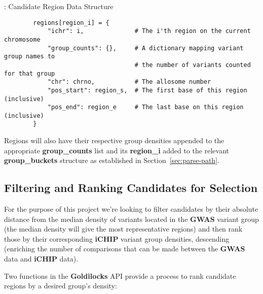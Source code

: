\begin{listing}[H]
    \caption[candidate-dict]{: Candidate Region Data Structure}
    \label{list:candidate-dict}
    \begin{verbatim}
        regions[region_i] = {
            "ichr": i,              # The i'th region on the current chromosome
            "group_counts": {},     # A dictionary mapping variant group names to
                                    # the number of variants counted for that group
            "chr": chrno,           # The allosome number
            "pos_start": region_s,  # The first base of this region (inclusive)
            "pos_end": region_e     # The last base on this region (inclusive)
        }
    \end{verbatim}
\end{listing}

Regions will also have their respective group densities appended to the
appropriate \textbf{group\_counts} list and its \textbf{region\_i} added to the
relevant \textbf{group\_buckets} structure as established in
Section~\ref{sec:parse-path}.


\subsection{Filtering and Ranking Candidates for Selection}

For the purpose of this project we're looking to filter candidates by their
absolute distance from the median density of variants located in the
\textbf{GWAS} variant group (the median density will give the most representative
regions) and then rank those by their corresponding \textbf{iCHIP} variant group
densities, descending (enriching the number of comparisons that can be made
between the \textbf{GWAS} data and \textbf{iCHIP} data).

Two functions in the \textbf{Goldilocks} API provide a process to rank candidate
regions by a desired group's density:

